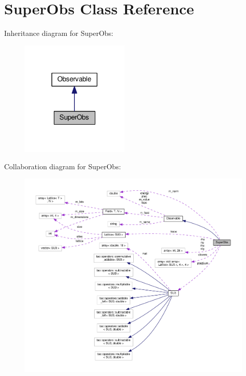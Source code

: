 \hypertarget{classSuperObs}{}\section{Super\+Obs Class Reference}
\label{classSuperObs}


Inheritance diagram for Super\+Obs\+:\nopagebreak
\begin{figure}[H]
\begin{center}
\leavevmode
\includegraphics[width=146pt]{d9/d4c/classSuperObs__inherit__graph}
\end{center}
\end{figure}


Collaboration diagram for Super\+Obs\+:\nopagebreak
\begin{figure}[H]
\begin{center}
\leavevmode
\includegraphics[width=350pt]{d0/d3f/classSuperObs__coll__graph}
\end{center}
\end{figure}
